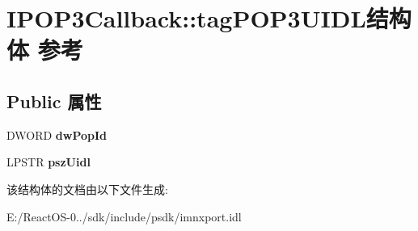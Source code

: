 \hypertarget{struct_i_p_o_p3_callback_1_1tag_p_o_p3_u_i_d_l}{}\section{I\+P\+O\+P3\+Callback\+:\+:tag\+P\+O\+P3\+U\+I\+D\+L结构体 参考}
\label{struct_i_p_o_p3_callback_1_1tag_p_o_p3_u_i_d_l}
\subsection*{Public 属性}
\begin{DoxyCompactItemize}
\item 
\mbox{\label{struct_i_p_o_p3_callback_1_1tag_p_o_p3_u_i_d_l_af5222f6b042624ee4bc61fabf5747df9}} 
D\+W\+O\+RD {\bfseries dw\+Pop\+Id}
\item 
\mbox{\label{struct_i_p_o_p3_callback_1_1tag_p_o_p3_u_i_d_l_a7d2517ba614ba04796315a42c34c41ef}} 
L\+P\+S\+TR {\bfseries psz\+Uidl}
\end{DoxyCompactItemize}


该结构体的文档由以下文件生成\+:\begin{DoxyCompactItemize}
\item 
E\+:/\+React\+O\+S-\/0../sdk/include/psdk/imnxport.\+idl\end{DoxyCompactItemize}
